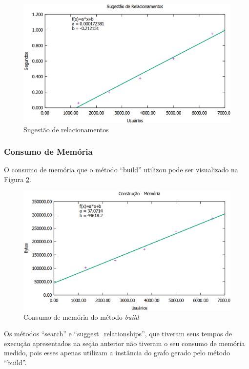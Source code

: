 \begin{figure}[!h]
	\centering
	\includegraphics[scale=0.55]{figuras/resultados/graficos/sugestao_relacionamentos.eps}
	\caption[Sugestão de relacionamentos]{Sugestão de relacionamentos}
	\label{suggest}
\end{figure}

\subsubsection{Consumo de Memória}

O consumo de memória que o método ``build'' utilizou pode ser visualizado na Figura \ref{build_memoria}.

\begin{figure}[!h]
	\centering
	\includegraphics[scale=0.55]{figuras/resultados/graficos/construcao_memoria.eps}
	\caption[Consumo de memória do método build]{Consumo de memória do método \textit{build}}
	\label{build_memoria}
\end{figure}

Os métodos ``search'' e ``suggest\_relationships'', que tiveram seus tempos de execução apresentados na seção anterior não tiveram o seu consumo de memória medido, pois esses apenas utilizam a instância do grafo gerado pelo método ``build''.

